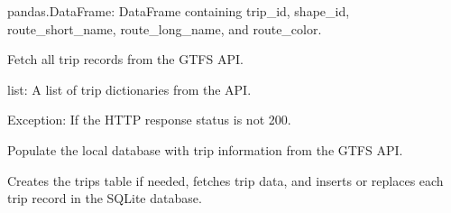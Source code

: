 \documentclass[letterpaper,10pt,english]{sphinxmanual}
\begin{document}
\begin{fulllineitems}
\begin{fulllineitems}
\begin{description}
\sphinxAtStartPar
pandas.DataFrame: DataFrame containing trip\_id, shape\_id,
route\_short\_name, route\_long\_name, and route\_color.

\end{description}

\end{fulllineitems}


\begin{fulllineitems}
\label{\detokenize{api:managers.trip_manager.TripManager.get_trips}}
\pysigstartsignatures
{}
\pysigstopsignatures
\sphinxAtStartPar
Fetch all trip records from the GTFS API.
\begin{description}
\sphinxAtStartPar
list: A list of trip dictionaries from the API.

\sphinxAtStartPar
Exception: If the HTTP response status is not 200.

\end{description}

\end{fulllineitems}


\begin{fulllineitems}
\label{\detokenize{api:managers.trip_manager.TripManager.set_trips}}
\pysigstartsignatures
{}
\pysigstopsignatures
\sphinxAtStartPar
Populate the local database with trip information from the GTFS API.

\sphinxAtStartPar
Creates the trips table if needed, fetches trip data, and inserts or replaces
each trip record in the SQLite database.

\end{fulllineitems}


\end{fulllineitems}

\label{\detokenize{api:module-managers.request_manager}}
\end{document}
